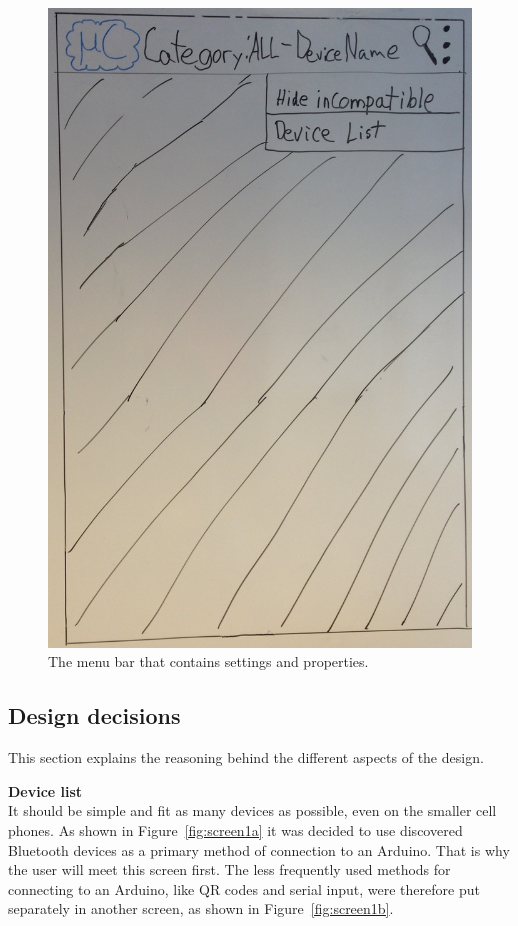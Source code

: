 \begin{figure}[H]
\centering
\includegraphics[scale=0.2]{images/Design_guide/ScreenXa.png}
\caption[Screen Xa - Action overflow]{The menu bar that contains settings and properties.}
\label{fig:screenXa}
\end{figure}

	\subsection{Design decisions}
	This section explains the reasoning behind the different aspects of the design. 

	\textbf{Device list}\\
	It should be simple and fit as many devices as possible, even on the smaller cell phones. As shown in Figure~\ref{fig:screen1a} it was decided to use discovered Bluetooth devices as a primary method of connection to an Arduino. That is why the user will meet this screen first. The less frequently used methods for connecting to an Arduino, like QR codes and serial input, were therefore put separately in another screen, as shown in Figure~\ref{fig:screen1b}. \\

